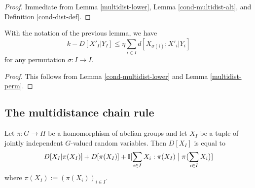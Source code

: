 \begin{proof}
  Immediate from Lemma \ref{multidist-lower}, Lemma \ref{cond-multidist-alt}, and Definition \ref{cond-dist-def}.
\end{proof}

\begin{corollary}\label{cond-multidist-lower-II} With the notation of the previous lemma, we have
  \begin{equation}\label{5.3-conv}
    k - D[ X'_{I} | Y_{I} ] \leq \eta \sum_{i \in I} d[X_{\sigma(i)};X'_i|Y_i]
  \end{equation}
for any permutation $\sigma : I \rightarrow I$.
\end{corollary}

\begin{proof}  This follows from Lemma \ref{cond-multidist-lower} and Lemma \ref{multidist-perm}.
\end{proof}

\subsection{The multidistance chain rule}

\begin{lemma}\label{multidist-chain-rule}  Let $\pi \colon G \to H$ be a homomorphism of abelian groups and let $X_{I}$ be a tuple of jointly independent $G$-valued random variables.  Then $D[X_{I}]$ is equal to
  \begin{equation}
      D[ X_{I} | \pi(X_{I}) ]  +D[ \pi(X_{I}) ]  + \mathbb{I}[ \sum_{i \in I} X_i  : \pi(X_{I}) \; \big| \; \pi\bigl(\sum_{i \in I} X_i\bigr) ]
    \label{chain-eq}
  \end{equation}
  where $\pi(X_I) := (\pi(X_i))_{i \in I}$.
  \end{lemma}

